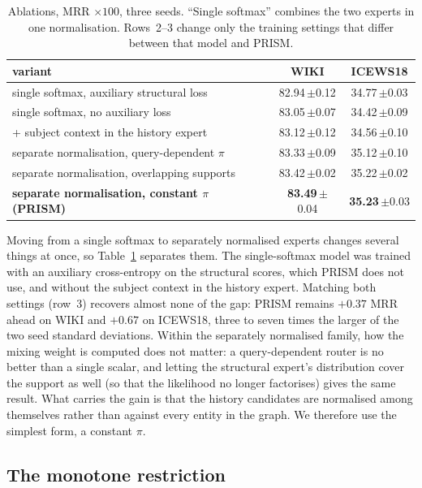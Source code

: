 \documentclass[conference]{IEEEtran}
\newcommand{\sd}[1]{\,{\scriptsize$\pm$#1}}
\begin{document}
\begin{table}[t]
\centering
\caption{Ablations, MRR $\times100$, three seeds. ``Single softmax'' combines
the two experts in one normalisation. Rows~2--3 change only the training
settings that differ between that model and PRISM.}
\label{tab:ablation}
\setlength{\tabcolsep}{3pt}
\begin{tabular}{lcc}
\toprule
variant & WIKI & ICEWS18 \\
\midrule
single softmax, auxiliary structural loss          & 82.94\sd{0.12} & 34.77\sd{0.03} \\
single softmax, no auxiliary loss                  & 83.05\sd{0.07} & 34.42\sd{0.09} \\
\quad + subject context in the history expert      & 83.12\sd{0.12} & 34.56\sd{0.10} \\
\midrule
separate normalisation, query-dependent $\pi$      & 83.33\sd{0.09} & 35.12\sd{0.10} \\
separate normalisation, overlapping supports       & 83.42\sd{0.02} & 35.22\sd{0.02} \\
\textbf{separate normalisation, constant $\pi$ (PRISM)} & \textbf{83.49}\sd{0.04} & \textbf{35.23}\sd{0.03} \\
\bottomrule
\end{tabular}
\end{table}

Moving from a single softmax to separately normalised experts changes several
things at once, so Table~\ref{tab:ablation} separates them. The single-softmax
model was trained with an auxiliary cross-entropy on the structural scores,
which PRISM does not use, and without the subject context in the history
expert. Matching both settings (row~3) recovers almost none of the gap: PRISM
remains $+0.37$ MRR ahead on WIKI and $+0.67$ on ICEWS18, three to seven times
the larger of the two seed standard deviations. Within the separately normalised family, how the
mixing weight is computed does not matter: a query-dependent router is no
better than a single scalar, and letting the structural expert's distribution
cover the support as well (so that the likelihood no longer factorises) gives
the same result. What carries the gain is that the history candidates are
normalised among themselves rather than against every entity in the graph.
We therefore use the simplest form, a constant $\pi$.

\subsection{The monotone restriction}
\end{document}
